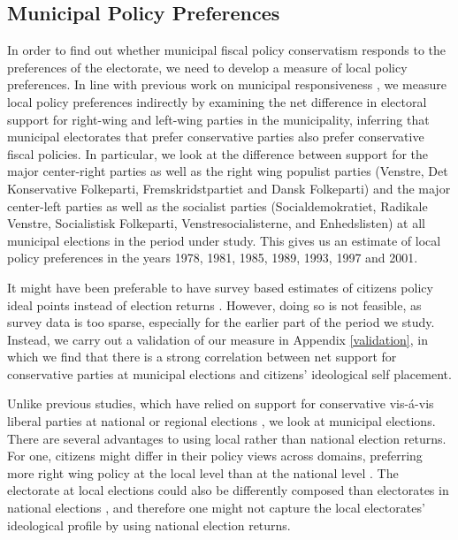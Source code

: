 \documentclass[a4paper,12pt]{article}
\begin{document}
\subsection*{Municipal Policy Preferences}

In order to find out whether municipal fiscal policy conservatism responds to the preferences of the electorate, we need to develop a measure of local policy preferences. In line with previous work on municipal responsiveness \cite[e.g.,][]{sances2017ideology,einstein2016pushing}, we measure local policy preferences indirectly by examining the net difference in electoral support for right-wing and left-wing parties in the municipality, inferring that municipal electorates that prefer conservative parties also prefer conservative fiscal policies. In particular, we look at the difference between support for the major center-right parties as well as the right wing populist parties (Venstre, Det Konservative Folkeparti, Fremskridstpartiet and Dansk Folkeparti) and the major center-left parties as well as the socialist parties (Socialdemokratiet, Radikale Venstre, Socialistisk Folkeparti, Venstresocialisterne, and Enhedslisten) at all municipal elections in the period under study. This gives us an estimate of local policy preferences in the years 1978, 1981, 1985, 1989, 1993, 1997 and 2001.

It might have been preferable to have survey based estimates of citizens policy ideal points instead of election returns \citep[similar to the measure used by][]{tausanovitch2014representation}. However, doing so is not feasible, as survey data is too sparse, especially for the earlier part of the period we study. Instead, we carry out a validation of our measure in Appendix \ref{validation}, in which we find that there is a strong correlation between net support for conservative parties at municipal elections and citizens' ideological self placement.

 Unlike previous studies, which have relied on support for conservative vis-á-vis liberal parties at national or regional elections \citep[e.g.,][]{hajnal2010or,einstein2016pushing}, we look at municipal elections. There are several advantages to using local rather than national election returns. For one, citizens might differ in their policy views across domains, preferring more right wing policy at the local level than at the national level \cite[for an argument along these lines, see][]{abrams2012big}. The electorate at local elections could also be differently composed than electorates in national elections \citep{ansolabehere2015beyond}, and therefore one might not capture the local electorates' ideological profile by using national election returns.
\end{document}
